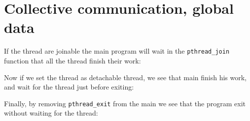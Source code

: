 \chapter{Collective communication, global data}

If the thread are joinable the main program will wait in the \verb+pthread_join+ function that all the thread finish their work:



Now if we set the thread as detachable thread, we see that main finish his work, and wait for the thread just before exiting:



Finally, by removing \verb+pthread_exit+ from the main we see that the program exit without waiting for the thread:


